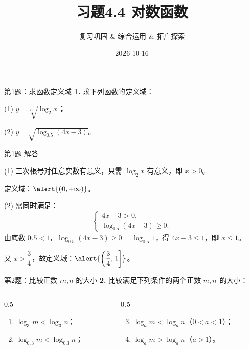 \documentclass[10pt,aspectratio=169,serif]{beamer}
\title[习题4.4]{习题4.4 对数函数}
\subtitle{复习巩固 \& 综合运用 \& 拓广探索}
\author{}
\institute{}
\date{2026-10-16}
\begin{document}
\begin{frame}
  \titlepage
\end{frame}

\begin{frame}[t]{第1题：求函数定义域}
\textbf{1.} 求下列函数的定义域：

\vspace{1em}
(1) $y = \sqrt[3]{\log_2 x}$；

\vspace{1em}
(2) $y = \sqrt{\log_{0.5}(4x-3)}$。
\end{frame}

\begin{frame}[t]{第1题 解答}
\begin{tcolorbox}[colback=orange!10,colframe=orange,title=\textbf{解}]
(1) 三次根号对任意实数有意义，只需 $\log_2 x$ 有意义，即 $x>0$。

\hspace{2em}定义域：$\alert{(0, +\infty)}$。

(2) 需同时满足：
\[
\begin{cases}
4x-3 > 0,\\
\log_{0.5}(4x-3) \geq 0.
\end{cases}
\]
由底数 $0.5<1$，$\log_{0.5}(4x-3)\geq 0 = \log_{0.5} 1$，得 $4x-3 \leq 1$，即 $x\leq 1$。

\hspace{2em}又 $x>\dfrac{3}{4}$，故定义域：$\alert{\left(\dfrac{3}{4},\, 1\right]}$。
\end{tcolorbox}
\end{frame}

\begin{frame}[t]{第2题：比较正数 $m, n$ 的大小}
\textbf{2.} 比较满足下列条件的两个正数 $m, n$ 的大小：

\vspace{0.5em}
\begin{columns}[t]
\begin{column}{0.5\textwidth}
\begin{enumerate}
  \item $\log_3 m < \log_3 n$；
  \item $\log_{0.3} m < \log_{0.3} n$；
\end{enumerate}
\end{column}
\begin{column}{0.5\textwidth}
\begin{enumerate}\setcounter{enumi}{2}
  \item $\log_a m < \log_a n$（$0<a<1$）；
  \item $\log_a m > \log_a n$（$a>1$）。
\end{enumerate}
\end{column}
\end{columns}
\end{frame}
\end{document}
